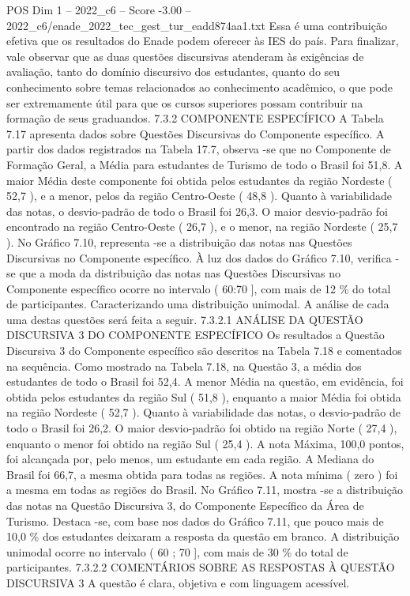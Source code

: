 \begin{textsample}{POS Dim 1 – 2022\_c6 – Score -3.00 – 2022\_c6/enade\_2022\_tec\_gest\_tur\_eadd874aa1.txt}
Essa é uma contribuição efetiva que os resultados do Enade podem oferecer às IES do país.
Para finalizar, vale observar que as duas questões discursivas atenderam às exigências de avaliação, tanto do domínio discursivo dos estudantes, quanto do seu conhecimento sobre temas relacionados ao conhecimento acadêmico, o que pode ser extremamente útil para que os cursos superiores possam contribuir na formação de seus graduandos. 7.3.2 COMPONENTE ESPECÍFICO A Tabela 7.17 apresenta dados sobre Questões Discursivas do Componente específico.
A partir dos dados registrados na Tabela 17.7, observa -se que no Componente de Formação Geral, a Média para estudantes de Turismo de todo o Brasil foi 51,8.
A maior Média deste componente foi obtida pelos estudantes da região Nordeste ( 52,7 ), e a menor, pelos da região Centro-Oeste ( 48,8 ).
Quanto à variabilidade das notas, o desvio-padrão de todo o Brasil foi 26,3.
O maior desvio-padrão foi encontrado na região Centro-Oeste ( 26,7 ), e o menor, na região Nordeste ( 25,7 ).
No Gráfico 7.10, representa -se a distribuição das notas nas Questões Discursivas no Componente específico.
À luz dos dados do Gráfico 7.10, verifica -se que a moda da distribuição das notas nas Questões Discursivas no Componente específico ocorre no intervalo ( 60:70 ], com mais de 12 \% do total de participantes.
Caracterizando uma distribuição unimodal.
A análise de cada uma destas questões será feita a seguir. 7.3.2.1 ANÁLISE DA QUESTÃO DISCURSIVA 3 DO COMPONENTE ESPECÍFICO Os resultados a Questão Discursiva 3 do Componente específico são descritos na Tabela 7.18 e comentados na sequência.
Como mostrado na Tabela 7.18, na Questão 3, a média dos estudantes de todo o Brasil foi 52,4.
A menor Média na questão, em evidência, foi obtida pelos estudantes da região Sul ( 51,8 ), enquanto a maior Média foi obtida na região Nordeste ( 52,7 ).
Quanto à variabilidade das notas, o desvio-padrão de todo o Brasil foi 26,2.
O maior desvio-padrão foi obtido na região Norte ( 27,4 ), enquanto o menor foi obtido na região Sul ( 25,4 ).
A nota Máxima, 100,0 pontos, foi alcançada por, pelo menos, um estudante em cada região.
A Mediana do Brasil foi 66,7, a mesma obtida para todas as regiões.
A nota mínima ( zero ) foi a mesma em todas as regiões do Brasil.
No Gráfico 7.11, mostra -se a distribuição das notas na Questão Discursiva 3, do Componente Específico da Área de Turismo.
Destaca -se, com base nos dados do Gráfico 7.11, que pouco mais de 10,0 \% dos estudantes deixaram a resposta da questão em branco.
A distribuição unimodal ocorre no intervalo ( 60 ; 70 ], com mais de 30 \% do total de participantes. 7.3.2.2 COMENTÁRIOS SOBRE AS RESPOSTAS À QUESTÃO DISCURSIVA 3 A questão é clara, objetiva e com linguagem acessível.

\end{textsample}

